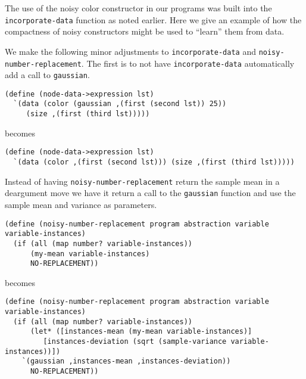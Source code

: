 \documentclass[a4paper,10pt]{article}
\begin{document}
The use of the noisy color constructor in our programs was built into the \texttt{incorporate-data} function as noted earlier.  Here we give an example of how the compactness of noisy constructors might be used to ``learn'' them from data.

We make the following minor adjustments to \texttt{incorporate-data} and \texttt{noisy-number-replacement}. The first is to not have \texttt{incorporate-data} automatically add a call to \texttt{gaussian}.
\begin{lstlisting}[frame=trblsingle]
(define (node-data->expression lst)
  `(data (color (gaussian ,(first (second lst)) 25))
	 (size ,(first (third lst)))))
\end{lstlisting}
becomes
\begin{lstlisting}[frame=trblsingle]
(define (node-data->expression lst)
  `(data (color ,(first (second lst))) (size ,(first (third lst)))))
\end{lstlisting}
Instead of having \texttt{noisy-number-replacement} return the sample mean in a deargument move we have it return a call to the \texttt{gaussian} function and use the sample mean and variance as parameters.
\begin{lstlisting}[frame=trbl]
(define (noisy-number-replacement program abstraction variable variable-instances)
  (if (all (map number? variable-instances))
      (my-mean variable-instances)
      NO-REPLACEMENT))
\end{lstlisting}
becomes
\begin{lstlisting}[frame=trblsingle]
(define (noisy-number-replacement program abstraction variable variable-instances)
  (if (all (map number? variable-instances))
      (let* ([instances-mean (my-mean variable-instances)]
	     [instances-deviation (sqrt (sample-variance variable-instances))])
	`(gaussian ,instances-mean ,instances-deviation))
      NO-REPLACEMENT))
\end{lstlisting}
\end{document}
